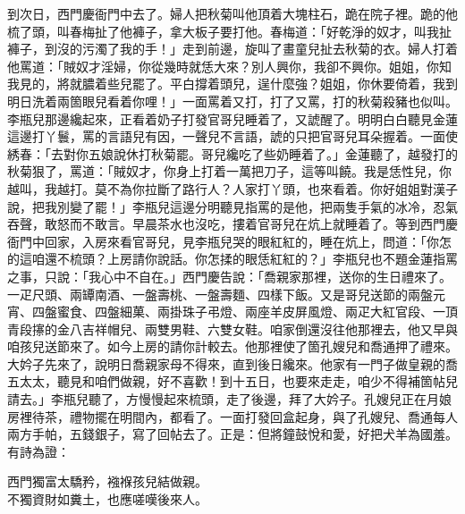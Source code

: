 到次日，西門慶衙門中去了。婦人把秋菊叫他頂着大塊柱石，跪在院子裡。跪的他梳了頭，叫春梅扯了他褲子，拿大板子要打他。春梅道：「好乾淨的奴才，叫我扯褲子，到沒的污濁了我的手！」走到前邊，旋叫了畫童兒扯去秋菊的衣。婦人打着他罵道：「賊奴才淫婦，你從幾時就恁大來？別人興你，我卻不興你。姐姐，你知我見的，將就膿着些兒罷了。平白撐着頭兒，逞什麼強？姐姐，你休要倚着，我到明日洗着兩箇眼兒看着你哩！」{}一面罵着又打，打了又罵，打的秋菊殺豬也似叫。李瓶兒那邊纔起來，正看着奶子打發官哥兒睡着了，又諕醒了。明明白白聽見金蓮這邊打丫鬟，罵的言語兒有因，一聲兒不言語，諕的只把官哥兒耳朵握着。一面使綉春：「去對你五娘說休打秋菊罷。哥兒纔吃了些奶睡着了。」金蓮聽了，越發打的秋菊狠了，罵道：「賊奴才，你身上打着一萬把刀子，這等叫饒。我是恁性兒，你越叫，我越打。{}莫不為你拉斷了路行人？人家打丫頭，也來看着。你好姐姐對漢子說，把我別變了罷！」李瓶兒這邊分明聽見指罵的是他，把兩隻手氣的冰冷，忍氣吞聲，敢怒而不敢言。早晨茶水也沒吃，摟着官哥兒在炕上就睡着了。等到西門慶衙門中回家，入房來看官哥兒，見李瓶兒哭的眼紅紅的，睡在炕上，問道：「你怎的這咱還不梳頭？上房請你說話。你怎揉的眼恁紅紅的？」李瓶兒也不題金蓮指罵之事，只說：「我心中不自在。」西門慶告說：「喬親家那裡，送你的生日禮來了。一疋尺頭、兩罈南酒、一盤壽桃、一盤壽麵、四樣下飯。又是哥兒送節的兩盤元宵、四盤蜜食、四盤細菓、兩掛珠子弔燈、兩座羊皮屏風燈、兩疋大紅官段、一頂青段㩟的金八吉祥帽兒、兩雙男鞋、六雙女鞋。咱家倒還沒往他那裡去，他又早與咱孩兒送節來了。如今上房的請你計較去。他那裡使了箇孔嫂兒和喬通押了禮來。大妗子先來了，說明日喬親家母不得來，直到後日纔來。他家有一門子做皇親的喬五太太，聽見和咱們做親，好不喜歡！到十五日，也要來走走，咱少不得補箇帖兒請去。」李瓶兒聽了，方慢慢起來梳頭，走了後邊，拜了大妗子。孔嫂兒正在月娘房裡待茶，禮物擺在明間內，都看了。一面打發回盒起身，與了孔嫂兒、喬通每人兩方手帕，五錢銀子，寫了回帖去了。正是：但將鐘鼓悅和愛，好把犬羊為國羞。有詩為證：

\begin{myquote}
西門獨富太驕矜，襁褓孩兒結做親。\\不獨資財如糞土，也應嗟嘆後來人。
\end{myquote}
